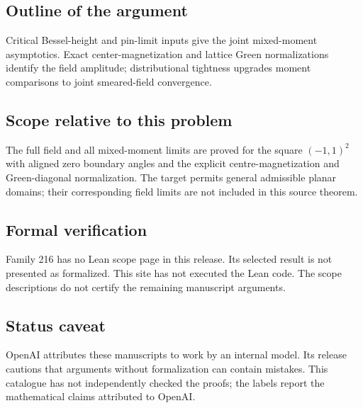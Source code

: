 \documentclass[11pt]{article}
\begin{document}
\subsection{Outline of the argument}
Critical Bessel-height and pin-limit inputs give the joint mixed-moment asymptotics. Exact center-magnetization and lattice Green normalizations identify the field amplitude; distributional tightness upgrades moment comparisons to joint smeared-field convergence.

\subsection{Scope relative to this problem}
The full field and all mixed-moment limits are proved for the square $(-1,1)^2$ with aligned zero boundary angles and the explicit centre-magnetization and Green-diagonal normalization. The target permits general admissible planar domains; their corresponding field limits are not included in this source theorem.

\subsection{Formal verification}
Family 216 has no Lean scope page in this release. Its selected result is not presented as formalized. This site has not executed the Lean code. The scope descriptions do not certify the remaining manuscript arguments.

\subsection{Status caveat}
OpenAI attributes these manuscripts to work by an internal model. Its release cautions that arguments without formalization can contain mistakes. This catalogue has not independently checked the proofs; the labels report the mathematical claims attributed to OpenAI.
\end{document}
